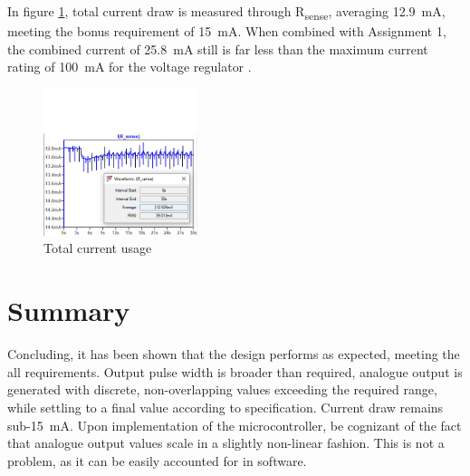In figure \ref{fig:current}, total current draw is measured through R\textsubscript{sense}, averaging \SI{12.9}{mA}, meeting the bonus requirement of \SI{15}{mA}. When combined with Assignment 1, the combined current of \SI{25.8}{mA} still is far less than the maximum current rating of \SI{100}{mA} for the voltage regulator \cite{prev}. 

 \begin{figure}
\centering
\includegraphics[width=0.4\textwidth]{./Figures/current}
\caption{Total current usage}
\label{fig:current}
\end{figure}

\section{Summary}\label{sec:temp_summary}
Concluding, it has been shown that the design performs as expected, meeting the all requirements. Output pulse width is broader than required, analogue output is generated with discrete, non-overlapping values exceeding the required range, while settling to a final value according to specification.  Current draw remains sub-\SI{15}{mA}. Upon implementation of the microcontroller, be cognizant of the fact that analogue output values scale in a slightly non-linear fashion. This is not a problem, as it can be easily accounted for in software.

